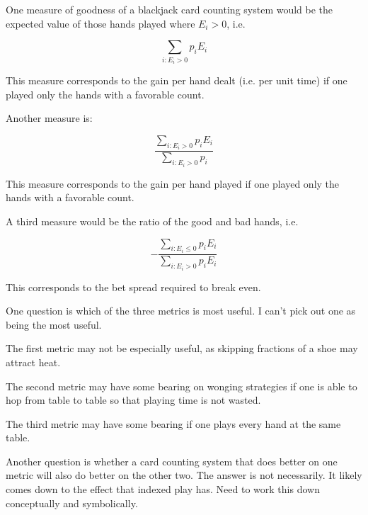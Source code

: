 One measure of goodness of a blackjack card counting system would be the
expected value of those hands played where $E_i > 0$, i.e.

\begin{equation}
\label{eq:cmct0:sctp0:sgcs0:02}
\sum_{i: E_i > 0} p_i E_i
\end{equation}

\noindent{}This measure corresponds to the gain per hand dealt (i.e. per unit time) if one
played only the hands with a favorable count.

Another measure is:

\begin{equation}
\label{eq:cmct0:sctp0:sgcs0:03}
\frac{\sum_{i: E_i > 0} p_i E_i}{\sum_{i: E_i > 0}p_i}
\end{equation}

\noindent{}This measure corresponds to the gain per hand played if one
played only the hands with a favorable count.

A third measure would be the ratio of the good and bad hands, i.e.

\begin{equation}
\label{eq:cmct0:sctp0:sgcs0:04}
-\frac{\sum_{i: E_i \leq 0} p_i E_i}{\sum_{i: E_i > 0}p_i E_i}
\end{equation}

\noindent{}This corresponds to the bet spread required to break even.

One question is which of the three metrics is most useful.  I can't pick out
one as being the most useful.

The first metric may not be especially useful, as
skipping fractions of a shoe may attract heat.

The second metric may have some bearing on wonging strategies if one
is able to hop from table to table so that playing time is not wasted.

The third metric may have some bearing if one plays every hand at the same
table.

Another question is whether a card counting system that does better on one metric
will also do better on the other two.  The answer is not necessarily.
It likely comes down to the effect that indexed play has.
Need to work this down conceptually and symbolically.

